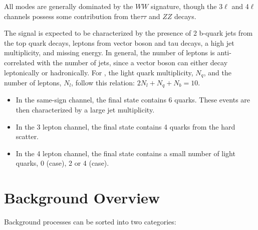 All modes are generally dominated by the $WW$ signature, though the 3$\ell$ and 4$\ell$
channels possess some contribution from the$\tau\tau$ and $ZZ$ decays. 


The signal is expected to be characterized by the presence of 2 b-quark jets from
the top quark decays, leptons from vector boson and tau decays,
a high jet multiplicity, and missing energy. In general, the number of leptons is anti-correlated 
with the number of jets, since a vector boson can either decay leptonically 
or hadronically. For \hww, the light quark multiplicity, $N_q$, and the
number of leptons, $N_l$, follow this relation: $2N_l+N_q+N_b=10$.

\begin{itemize}
\item In the same-sign channel, the \tth final state contains 6 quarks. These events
are then characterized by a large jet multiplicity.

\item In the 3 lepton channel, the \tth final state contains 4 quarks from the hard scatter.

\item In the 4 lepton channel, the \tth final state contains a small number of light
quarks, 0 (\hww case), 2 or 4 (\hzz case).


\end{itemize} 

\section{Background Overview}

Background processes can be sorted into two categories:

